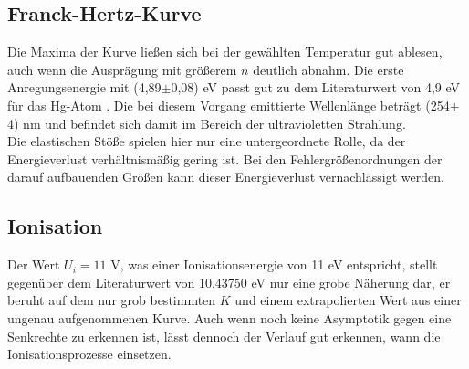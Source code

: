 \subsection{Franck-Hertz-Kurve}
Die Maxima der Kurve ließen sich bei der gewählten Temperatur gut ablesen, auch wenn 
die Ausprägung mit größerem $n$ deutlich abnahm. Die erste Anregungsenergie mit (4,89$\pm$0,08) eV
passt gut zu dem Literaturwert von 4,9 eV für das Hg-Atom \cite{tafel}. Die bei diesem Vorgang
emittierte Wellenlänge beträgt (254$\pm$4) nm und befindet sich damit im Bereich der ultravioletten
Strahlung. \\
Die elastischen Stöße spielen hier nur eine untergeordnete Rolle, da der Energieverlust verhältnismäßig
gering ist. Bei den Fehlergrößenordnungen der darauf aufbauenden Größen kann dieser Energieverlust 
vernachlässigt werden. 

\subsection{Ionisation}
 Der Wert $U_i=11$ V, was einer Ionisationsenergie von 11 eV
 entspricht, stellt gegenüber dem Literaturwert von 10,43750 eV \cite{codatahgi} nur eine grobe Näherung dar, er beruht auf dem nur grob bestimmten $K$
und einem extrapolierten Wert aus einer ungenau aufgenommenen Kurve. Auch wenn noch keine
Asymptotik gegen eine Senkrechte zu erkennen ist, lässt dennoch 
der Verlauf gut erkennen, wann die Ionisationsprozesse einsetzen.  


